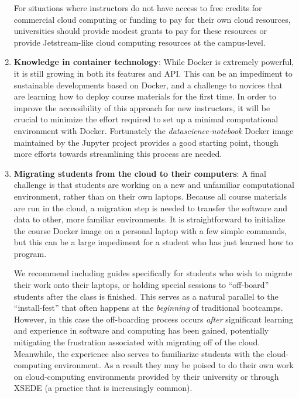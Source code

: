 \begin{enumerate}
For situations where instructors do not have access to free credits for
commercial cloud computing or funding to pay for their own
cloud resources, universities should provide modest grants to pay for
these resources or provide Jetstream-like cloud computing resources at the
campus-level.

\item {\bf Knowledge in container technology}: While Docker is extremely powerful,
it is still growing in both its features and API. This can be an impediment to
sustainable developments based on Docker, and a challenge to novices that are
learning how to deploy course materials for the first time. In order to improve
the accessibility of this approach for new instructors, it will be crucial to
minimize the effort required to set up a minimal computational environment with
Docker. Fortunately the \textit{datascience-notebook} Docker image maintained by the Jupyter
project provides a good starting point, though more efforts towards streamlining
this process are needed.

\item {\bf Migrating students from the cloud to their computers}: A final
challenge is that students are working on a new and
unfamiliar computational environment, rather than on their own laptops. Because
all course materials are run in the cloud, a migration step is
needed to transfer the software and data to other, more familiar environments.
It is straightforward to initialize the course Docker image on a
personal laptop with a
few simple commands, but this can be a large impediment for a student who has
just learned how to program.

We recommend including guides specifically for
students who wish to migrate their work onto their laptops, or holding special
sessions to ``off-board'' students after the class is finished. This serves as a
natural parallel to the ``install-fest'' that often happens at the
\emph{beginning} of traditional bootcamps. However, in this case the
off-boarding process occurs \emph{after} significant learning and experience in
software and computing has been gained, potentially mitigating the frustration
associated with migrating off of the cloud. Meanwhile, the experience also
serves to familiarize students with the cloud-computing environment. As a result
they may be poised to do their own work on cloud-computing environments
provided by their university or through XSEDE (a practice that is increasingly common).

\end{enumerate}


